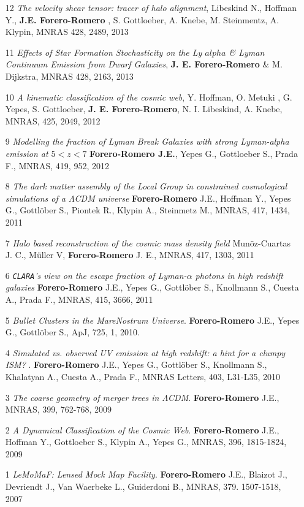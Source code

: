 \documentclass[letterpaper,11pt,onecolumn]{article}
\begin{document}
\begin{enumerate}
\item[12] {\it The velocity shear tensor: tracer of halo alignment},
  Libeskind N., Hoffman Y., {\bf J.E. Forero-Romero} , S. Gottloeber,
  A. Knebe, M. Steinmentz, A. Klypin, MNRAS 428, 2489, 2013 

\item[11] {\it Effects of Star Formation Stochasticity on the Ly
  $alpha$ \& Lyman Continuum Emission from Dwarf Galaxies}, {\bf
  J. E. Forero-Romero} \& M. Dijkstra, MNRAS 428, 2163, 2013 

\item[10] {\it A kinematic classification of the cosmic web},
  Y. Hoffman, O. Metuki , G. Yepes, S. Gottloeber, {\bf
    J. E. Forero-Romero}, N. I. Libeskind, A. Knebe, MNRAS, 425, 2049,
  2012 

\item[9] {\it Modelling the fraction of Lyman Break Galaxies with
  strong Lyman-alpha emission at $5 < z < 7$} {\bf Forero-Romero
  J.E.}, Yepes G., Gottloeber S., Prada F., MNRAS, 419, 952, 2012 

\item [8]
{\it The dark matter assembly of the Local Group in constrained cosmological
  simulations of a $\Lambda$CDM universe} {\bf Forero-Romero} J.E.,
Hoffman Y., Yepes G., Gottl\"ober S., Piontek R., Klypin A., Steinmetz
M.,  MNRAS, 417, 1434, 2011 

\item[7] 
{\it Halo based reconstruction of the cosmic mass density field}
Mun\~oz-Cuartas J. C., M\"uller V, {\bf Forero-Romero} J. E.,
MNRAS, 417, 1303, 2011 
 
\item [6]
{\it {\tt CLARA}'s view on the escape fraction of Lyman-$\alpha$ photons in
  high redshift galaxies}
{\bf Forero-Romero} J.E., Yepes G., Gottl\"ober S., Knollmann S., Cuesta A., Prada F.,  
MNRAS, 415, 3666, 2011

\item [5]
{\it Bullet Clusters in the MareNostrum Universe}. 
{\bf Forero-Romero} J.E., Yepes G., Gottl\"ober S., 
ApJ, 725, 1, 2010.

\item [4]
{\it Simulated vs. observed UV emission at high redshift: a hint for a clumpy
ISM? }. 
{\bf Forero-Romero} J.E., Yepes G., Gottl\"ober S., Knollmann S., Khalatyan A., Cuesta A., Prada F.,   MNRAS Letters, 403,  L31-L35, 2010

\item [3]
{\it The coarse geometry of merger trees in
  $\Lambda$CDM}.  {\bf Forero-Romero} J.E., 
MNRAS, 399, 762-768, 2009

\item [2]
{\it A Dynamical Classification of the  Cosmic Web}.  {\bf Forero-Romero} J.E., Hoffman Y.,  Gottloeber S., Klypin A., Yepes G.,
MNRAS, 396, 1815-1824, 2009

\item [1] 
{\it {\sc LeMoMaF}:  Lensed Mock Map Facility}. 
{\bf Forero-Romero} J.E., Blaizot J., Devriendt J., Van Waerbeke L., Guiderdoni B., 
MNRAS, 379. 1507-1518, 2007
\end{enumerate}
\end{document}
